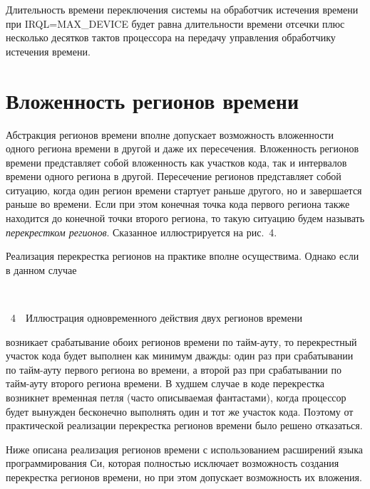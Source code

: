 \begin{multicols}{2}
   Длительность времени переключения системы на обработчик истечения времени при
IRQL\;=\;MAX\_DEVICE будет равна длительности времени отсечки плюс несколько десятков
тактов процессора на передачу управления обработчику истечения времени.

\section{Вложенность регионов времени} %

   Абстракция регионов времени вполне допускает возможность вложенности одного региона
времени в другой и даже их пересечения. Вложенность регионов времени представляет собой
вложенность как участков кода, так и интервалов времени одного региона в другой. Пересечение
регионов пред\-став\-ля\-ет собой ситуацию, когда один регион времени стартует раньше другого, но и
завершается раньше во времени. Если при этом конечная точка кода первого региона также
находится до конечной точки второго региона, то такую ситуацию будем называть \textit{перекрестком
регионов}. Сказанное иллюстрируется на рис.~4.



Реализация перекрестка регионов на практике вполне осуществима. Однако если в данном
случае 
\begin{center}
\vspace*{6pt}
\mbox{%
\epsfxsize=73.479mm
}
\end{center}
\vspace*{1pt}
{{\figurename~4}\ \ \small{Иллюстрация одновременного действия двух регионов времени}}
\bigskip
\addtocounter{figure}{1}  


\noindent
возникает срабатывание обоих регионов времени по тайм-ауту, то перекрестный участок
кода будет выполнен как минимум дважды: один раз при срабатывании по тайм-ауту первого
региона во времени, а второй раз при срабатывании по тайм-ауту второго региона времени. В
худшем случае в коде перекрестка возникнет временная петля (часто описываемая фантастами),
когда процессор будет вынужден бесконечно выполнять один и тот же участок кода. Поэтому от
практической реализации перекрестка регионов времени было решено отказаться.

Ниже описана реализация регионов времени с использованием расширений
языка программирования Си, которая полностью исключает возможность создания перекрестка
регионов времени, но при этом допускает возможность их вложения.


\end{multicols}
